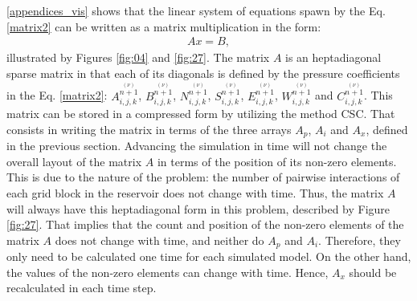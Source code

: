 \autoref{appendices_vis} shows that the linear system of equations spawn by the Eq. \ref{matrix2} can be written as a matrix multiplication in the form:
\begin{align}
\label{appendix_smr_1}
A x = B,
\end{align}
illustrated by Figures \ref{fig:04} and \ref{fig:27}. The matrix $A$ is an heptadiagonal sparse matrix in that each of its diagonals is defined by the pressure coefficients in the Eq. \ref{matrix2}: $A^{\stackrel{(\nu)}{n+1}}_{i,j,k}$, $B^{\stackrel{(\nu)}{n+1}}_{i,j,k}$, $N^{\stackrel{(\nu)}{n+1}}_{i,j,k}$, $S^{\stackrel{(\nu)}{n+1}}_{i,j,k}$, $E^{\stackrel{(\nu)}{n+1}}_{i,j,k}$, $W^{\stackrel{(\nu)}{n+1}}_{i,j,k}$ and $C^{\stackrel{(\nu)}{n+1}}_{i,j,k}$.
This matrix can be stored in a compressed form by utilizing the method CSC. That consists in writing the matrix in terms of the three arrays $A_p$, $A_i$ and $A_x$, defined in the previous section. Advancing the simulation in time will not change the overall layout of the matrix $A$ in terms of the position of its non-zero elements. This is due to the nature of the problem: the number of pairwise interactions of each grid block in the reservoir does not change with time. Thus, the matrix $A$ will always have this heptadiagonal form in this problem, described by Figure \ref{fig:27}. That implies that the count and position of the non-zero elements of the matrix $A$ does not change with time, and neither do $A_p$ and $A_i$. Therefore, they only need to be calculated one time for each simulated model. On the other hand, the values of the non-zero elements can change with time. Hence, $A_x$ should be recalculated in each time step. 

